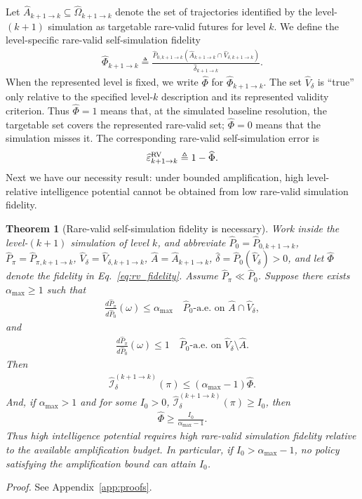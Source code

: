 \documentclass[
  aps,
  prresearch,
  reprint,
  amsmath,
  amssymb,
  superscriptaddress,
  nofootinbib,
  longbibliography
]{revtex4-2}
\def\EQSP{3pt}
\newcommand{\cgather}[2][\EQSP]{\begingroup\setlength\abovedisplayskip{#1}\setlength\belowdisplayskip{#1}\begin{gather} #2 \end{gather}\endgroup\noindent}
\newtheorem{theorem}{Theorem}
\newcommand{\calI}{\mathcal{I}}
\begin{document}
Let \(\widehat A_{k+1\to k}\subseteq\widehat\Omega_{k+1\to k}\) denote the set of trajectories identified by the level-\((k+1)\) simulation as targetable rare-valid futures for level \(k\). We define the level-specific rare-valid self-simulation fidelity
\cgather{
    \widehat\Phi_{k+1\to k}
    \triangleq 
    \frac{\widehat P_{0,k+1\to k}(\widehat A_{k+1\to k}\cap\widehat V_{\delta,k+1\to k})}{\widehat\delta_{k+1\to k}}.
    \label{eq:rv_fidelity}
}%
When the represented level is fixed, we write \(\widehat\Phi\) for \(\widehat\Phi_{k+1\to k}\). The set \(\widehat V_\delta\) is ``true'' only relative to the specified level-\(k\) description and its represented validity criterion. Thus \(\widehat\Phi=1\) means that, at the simulated baseline resolution, the targetable set covers the represented rare-valid set; \(\widehat\Phi=0\) means that the simulation misses it. The corresponding rare-valid self-simulation error is
\cgather{
    \widehat\varepsilon^{\rm RV}_{k+1\to k}
    \triangleq 
    1-\widehat\Phi.
    \label{eq:rv_error}
}%
Next we have our necessity result: under bounded amplification, high level-relative intelligence potential cannot be obtained from low rare-valid simulation fidelity.
%
\begin{theorem}[Rare-valid self-simulation fidelity is necessary]
\label{thm:rv_fidelity_necessity}
Work inside the level-\((k+1)\) simulation of level \(k\), and abbreviate
\(\widehat P_0=\widehat P_{0,k+1\to k}\),
\(\widehat P_\pi=\widehat P_{\pi,k+1\to k}\),
\(\widehat V_\delta=\widehat V_{\delta,k+1\to k}\),
\(\widehat A=\widehat A_{k+1\to k}\),
\(\widehat\delta=\widehat P_0(\widehat V_\delta)>0\), and let
\(\widehat\Phi\) denote the fidelity in Eq.~\eqref{eq:rv_fidelity}.
Assume \(\widehat P_\pi\ll \widehat P_0\). Suppose there exists \(\alpha_{\max}\geq1\) such that
\cgather{
    \frac{d\widehat P_\pi}{d\widehat P_0}(\omega)
    \leq
    \alpha_{\max}
    \quad
    \widehat P_0\text{-a.e. on }\widehat A\cap\widehat V_\delta,
    \label{eq:alpha_max_on_true_positive}
}
and
\cgather{
    \frac{d\widehat P_\pi}{d\widehat P_0}(\omega)
    \leq
    1
    \quad
    \widehat P_0\text{-a.e. on }\widehat V_\delta\setminus\widehat A.
    \label{eq:no_unidentified_amplification}
}
Then
\cgather{
    \widehat{\calI}_{\delta}^{(k+1\to k)}(\pi)
    \leq
    (\alpha_{\max}-1)\widehat\Phi.
    \label{eq:rv_necessity_bound}
}
And, if \(\alpha_{\max}>1\) and for some \(I_0>0\),
\(\widehat{\calI}_{\delta}^{(k+1\to k)}(\pi)\geq I_0\), then
\cgather{
    \widehat\Phi
    \geq
    \frac{I_0}{\alpha_{\max}-1}.
    \label{eq:rv_necessity_i0}
}
Thus high intelligence potential requires high rare-valid simulation fidelity relative to the available amplification budget. In particular, if \(I_0>\alpha_{\max}-1\), no policy satisfying the amplification bound can attain \(I_0\).
\end{theorem}
\noindent\emph{Proof.} See Appendix~\ref{app:proofs}.
\end{document}
